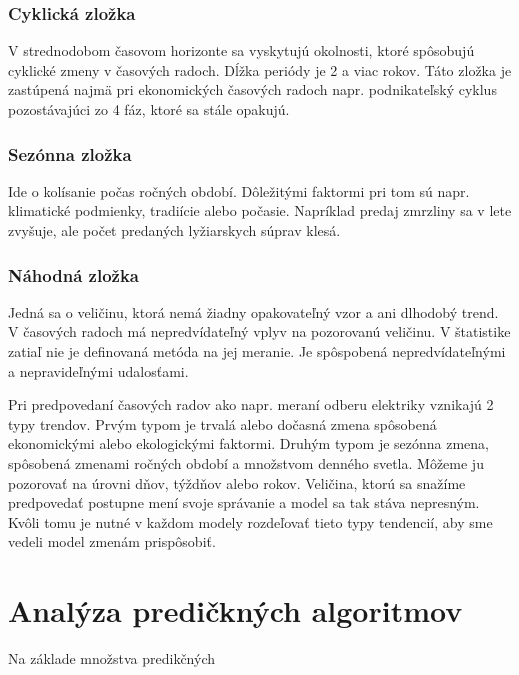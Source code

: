 \documentclass[12pt,oneside,slovak,a4paper]{book}
\begin{document}
\subsection{Cyklická zložka}
V strednodobom časovom horizonte sa vyskytujú okolnosti, ktoré spôsobujú
cyklické zmeny v časových radoch. Dĺžka periódy je 2 a viac rokov. Táto zložka
je zastúpená najmä pri ekonomických časových radoch napr. podnikateľský cyklus
pozostávajúci zo 4 fáz, ktoré sa stále opakujú\cite{Agrawal2013}.

\subsection{Sezónna zložka}
Ide o kolísanie počas ročných období. Dôležitými faktormi pri tom sú napr.
klimatické podmienky, tradiície alebo počasie. Napríklad predaj zmrzliny sa
v lete zvyšuje, ale počet predaných lyžiarskych súprav klesá\cite{Agrawal2013}.

\subsection{Náhodná zložka}
Jedná sa o veličinu, ktorá nemá žiadny opakovateľný vzor a ani dlhodobý trend.
V časových radoch má nepredvídateľný vplyv na pozorovanú veličinu. V štatistike
zatiaľ nie je definovaná metóda na jej meranie. Je spôspobená nepredvídateľnými
a nepravideľnými udalosťami\cite{Agrawal2013}.

Pri predpovedaní časových radov ako napr. meraní odberu elektriky vznikajú
2 typy trendov. Prvým typom je trvalá alebo dočasná zmena spôsobená
ekonomickými alebo ekologickými faktormi. Druhým typom je sezónna zmena,
spôsobená zmenami ročných období a množstvom denného svetla. Môžeme ju pozorovať
na úrovni dňov, týždňov alebo rokov. Veličina, ktorú sa snažíme predpovedať
postupne mení svoje správanie a model sa tak stáva nepresným. Kvôli tomu je
nutné v každom modely rozdeľovať tieto typy tendencií, aby sme vedeli model
zmenám prispôsobiť\cite{Grmanova2016}.



\chapter{Analýza predičkných algoritmov}
Na základe množstva predikčných
\end{document}
